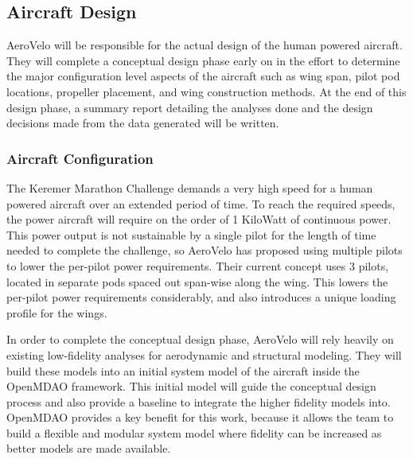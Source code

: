 \documentclass[]{aiaa-tc}
\begin{document}

    \subsection{Aircraft Design}

        AeroVelo will be responsible for the actual design of the human powered aircraft. They will complete a conceptual design 
        phase early on in the effort to determine the major configuration level aspects of the aircraft such as wing span, pilot pod
        locations, propeller placement, and wing construction methods. At the end of this design phase, a summary report detailing
        the analyses done and the design decisions made from the data generated will be written. 

        \subsubsection{Aircraft Configuration}

        The Keremer Marathon Challenge demands a very high speed for a human powered aircraft over an extended period of time. To reach the 
        required speeds, the power aircraft will require on the order of 1 KiloWatt of continuous power. This power output is not 
        sustainable by a single pilot for the length of time needed to complete the challenge, so AeroVelo has proposed using multiple 
        pilots to lower the per-pilot power requirements. Their current concept uses 3 pilots, located in separate pods spaced out 
        span-wise along the wing. This lowers the per-pilot power requirements considerably, and also introduces a unique loading profile 
        for the wings. 

        In order to complete the conceptual design phase, AeroVelo will rely heavily on existing low-fidelity analyses for aerodynamic and 
        structural modeling. They will build these models into an initial system model of the aircraft inside the OpenMDAO framework. 
        This initial model will guide the conceptual design process and also provide a baseline to integrate the higher fidelity models into. 
        OpenMDAO provides a key benefit for this work, because it allows the team to build a flexible and modular system model where fidelity can 
        be increased as better models are made available. 
\end{document}
